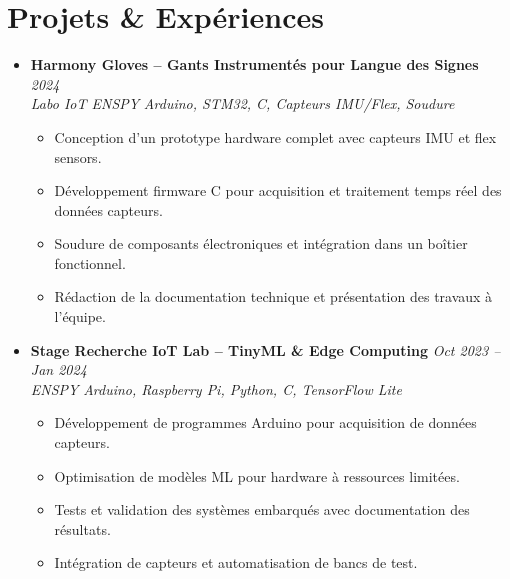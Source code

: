 \documentclass[a4paper,11pt]{article}
\begin{document}
\section{Projets \& Expériences}
\begin{itemize}[leftmargin=*, label={-}]

\item \textbf{Harmony Gloves -- Gants Instrumentés pour Langue des Signes} \hfill \textit{2024} \\
\textit{Labo IoT ENSPY} \hfill \textit{Arduino, STM32, C, Capteurs IMU/Flex, Soudure}
\vspace{-2pt}
    \begin{itemize}[leftmargin=0.4cm, nosep, label=\tiny$\bullet$]
        \item \small{Conception d'un prototype hardware complet avec capteurs IMU et flex sensors.}
        \item \small{Développement firmware C pour acquisition et traitement temps réel des données capteurs.}
        \item \small{Soudure de composants électroniques et intégration dans un boîtier fonctionnel.}
        \item \small{Rédaction de la documentation technique et présentation des travaux à l'équipe.}
    \end{itemize}
\vspace{3pt}

\item \textbf{Stage Recherche IoT Lab -- TinyML \& Edge Computing} \hfill \textit{Oct 2023 -- Jan 2024} \\
\textit{ENSPY} \hfill \textit{Arduino, Raspberry Pi, Python, C, TensorFlow Lite}
\vspace{-2pt}
    \begin{itemize}[leftmargin=0.4cm, nosep, label=\tiny$\bullet$]
        \item \small{Développement de programmes Arduino pour acquisition de données capteurs.}
        \item \small{Optimisation de modèles ML pour hardware à ressources limitées.}
        \item \small{Tests et validation des systèmes embarqués avec documentation des résultats.}
        \item \small{Intégration de capteurs et automatisation de bancs de test.}
    \end{itemize}
\vspace{3pt}


\end{itemize}
\end{document}
